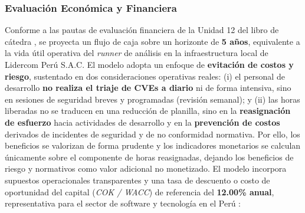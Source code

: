 \subsubsection{Evaluación Económica y Financiera}
Conforme a las pautas de evaluación financiera de la Unidad 12 del libro de cátedra \parencite{torres2026proyecto}, se proyecta un flujo de caja sobre un horizonte de \textbf{5 años}, equivalente a la vida útil operativa del \textit{runner} de análisis en la infraestructura local de Lidercom Perú S.A.C. %
El modelo adopta un enfoque de \textbf{evitación de costos y riesgo}, sustentado en dos consideraciones operativas reales: (i) el personal de desarrollo \textbf{no realiza el triaje de CVEs a diario} ni de forma intensiva, sino en sesiones de seguridad breves y programadas (revisión semanal); y (ii) las horas liberadas no se traducen en una reducción de planilla, sino en la \textbf{reasignación de esfuerzo} hacia actividades de desarrollo y en la \textbf{prevención de costos} derivados de incidentes de seguridad y de no conformidad normativa. %
Por ello, los beneficios se valorizan de forma prudente y los indicadores monetarios se calculan únicamente sobre el componente de horas reasignadas, dejando los beneficios de riesgo y normativos como valor adicional no monetizado. %
El modelo incorpora supuestos operacionales transparentes y una tasa de descuento o costo de oportunidad del capital (\textit{COK / WACC}) de referencia del \textbf{12.00\% anual}, representativa para el sector de software y tecnología en el Perú \parencite{gutierrez2024auditoria, torres2026proyecto}: %
